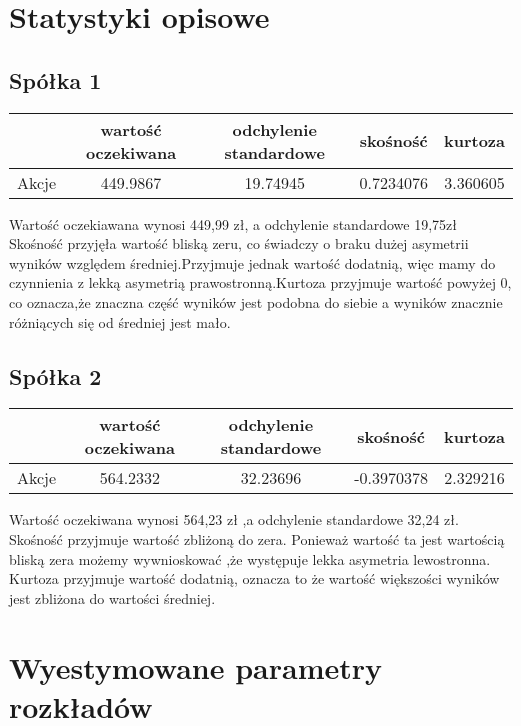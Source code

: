 \documentclass[a4paper,11pt]{article}
\begin{document}
\section{Statystyki opisowe}
\subsection{Spółka 1}

\begin{tabular}{ |c | c | c| c |c| } 
  \hline
    & wartość oczekiwana & odchylenie standardowe & skośność & kurtoza \\ 
  \hline
  Akcje & 449.9867    & 19.74945 & 0.7234076 & 3.360605\\ 
  \hline
\end{tabular}

\begin{flushleft}
{ Wartość oczekiawana wynosi 449,99 zł, a odchylenie standardowe 19,75zł Skośność przyjęła wartość bliską zeru, co świadczy o braku dużej asymetrii wyników względem średniej.Przyjmuje jednak wartość dodatnią, więc mamy do czynnienia z lekką asymetrią prawostronną.Kurtoza przyjmuje wartość powyżej 0, co oznacza,że znaczna część wyników  jest podobna do siebie a wyników znacznie różniących się od średniej jest mało.}
\end{flushleft}

\subsection{Spółka 2}

\begin{tabular}{ |c | c | c| c |c| } 
  \hline
    & wartość oczekiwana & odchylenie standardowe & skośność & kurtoza \\ 
  \hline
  Akcje & 564.2332    & 32.23696 & -0.3970378 & 2.329216\\ 
  \hline
\end{tabular}
\begin{flushleft}
{Wartość oczekiwana wynosi 564,23 zł ,a odchylenie standardowe 
32,24 zł. Skośność przyjmuje wartość zbliżoną do zera. Ponieważ wartość ta jest wartością bliską zera możemy wywnioskować ,że występuje lekka asymetria lewostronna.
Kurtoza przyjmuje wartość dodatnią, oznacza to że wartość większości wyników jest zbliżona do wartości średniej.}
\end{flushleft}


\section{Wyestymowane parametry rozkładów}
\end{document}
